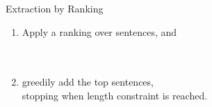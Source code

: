 \documentclass[xcolor={table}]{beamer}
\newcommand\spit{\hspace{\labelwidth}}
\begin{document}
\begin{frame}{
      }
\begin{figure}[!h]
 \end{figure}
\end{frame}

\begin{frame}{Extraction by Ranking}
    \begin{enumerate}
        \item Apply a ranking over sentences, and 
            ~\\
            ~\\
            ~\\
        \item greedily add the top sentences,\\
            \spit stopping when length
            constraint is reached.
    \end{enumerate}

\end{frame}
\end{document}
